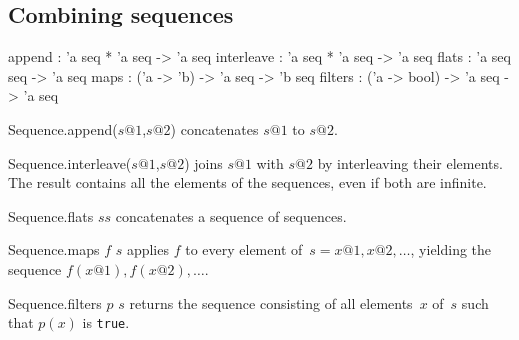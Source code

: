 \subsection{Combining sequences}
\begin{ttbox} 
append     : 'a seq * 'a seq -> 'a seq
interleave : 'a seq * 'a seq -> 'a seq
flats      : 'a seq seq -> 'a seq
maps       : ('a -> 'b) -> 'a seq -> 'b seq
filters    : ('a -> bool) -> 'a seq -> 'a seq
\end{ttbox} 
\begin{ttdescription}
\item[Sequence.append($s@1$,$s@2$)] 
concatenates $s@1$ to $s@2$.

\item[Sequence.interleave($s@1$,$s@2$)] 
joins $s@1$ with $s@2$ by interleaving their elements.  The result contains
all the elements of the sequences, even if both are infinite.

\item[Sequence.flats $ss$] 
concatenates a sequence of sequences.

\item[Sequence.maps $f$ $s$] 
applies $f$ to every element of~$s=x@1,x@2,\ldots$, yielding the sequence
$f(x@1),f(x@2),\ldots$.

\item[Sequence.filters $p$ $s$] 
returns the sequence consisting of all elements~$x$ of~$s$ such that $p(x)$
is {\tt true}.
\end{ttdescription}

